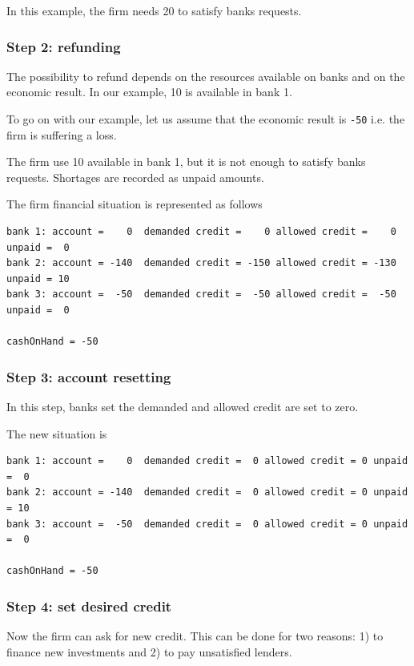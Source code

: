 \documentclass{article}
\begin{document}
In this example, the firm needs 20 to satisfy banks requests.

\subsubsection*{Step 2: refunding}

The possibility to refund depends on the resources available on banks and on the economic result. In our example, 10 is available in bank 1.

To go on with our example, let us assume that the economic result is \verb+-50+ i.e. the firm is suffering a loss.

The firm use 10 available in bank 1, but it is not enough to satisfy banks requests. Shortages are recorded as unpaid amounts.

The firm financial situation is represented as follows

\begin{verbatim}
bank 1: account =    0  demanded credit =    0 allowed credit =    0 unpaid =  0
bank 2: account = -140  demanded credit = -150 allowed credit = -130 unpaid = 10
bank 3: account =  -50  demanded credit =  -50 allowed credit =  -50 unpaid =  0

cashOnHand = -50
\end{verbatim}

\subsubsection*{Step 3: account resetting}
In this step, banks set the demanded and allowed credit are set to zero.

The new situation is

\begin{verbatim}
bank 1: account =    0  demanded credit =  0 allowed credit = 0 unpaid =  0
bank 2: account = -140  demanded credit =  0 allowed credit = 0 unpaid = 10
bank 3: account =  -50  demanded credit =  0 allowed credit = 0 unpaid =  0

cashOnHand = -50
\end{verbatim}



\subsubsection*{Step 4: set desired credit}

Now the firm can ask for new credit. This can be done for two reasons: 1) to finance new investments and 2) to pay unsatisfied lenders.
\end{document}
